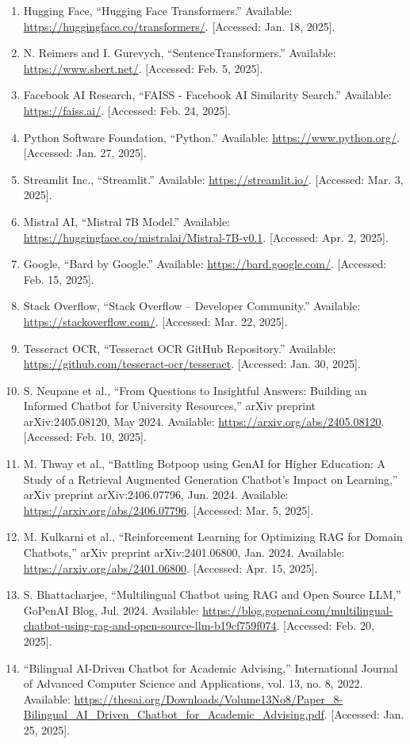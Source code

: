 \documentclass[12pt]{report}
\begin{document}
\vspace{1cm} 

\begin{enumerate}
    \item Hugging Face, “Hugging Face Transformers.” Available: \url{https://huggingface.co/transformers/}. [Accessed: Jan. 18, 2025].
    \item N. Reimers and I. Gurevych, “SentenceTransformers.” Available: \url{https://www.sbert.net/}. [Accessed: Feb. 5, 2025].
    \item Facebook AI Research, “FAISS - Facebook AI Similarity Search.” Available: \url{https://faiss.ai/}. [Accessed: Feb. 24, 2025].
    \item Python Software Foundation, “Python.” Available: \url{https://www.python.org/}. [Accessed: Jan. 27, 2025].
    \item Streamlit Inc., “Streamlit.” Available: \url{https://streamlit.io/}. [Accessed: Mar. 3, 2025].
    \item Mistral AI, “Mistral 7B Model.” Available: \url{https://huggingface.co/mistralai/Mistral-7B-v0.1}. [Accessed: Apr. 2, 2025].
    \item Google, “Bard by Google.” Available: \url{https://bard.google.com/}. [Accessed: Feb. 15, 2025].
    \item Stack Overflow, “Stack Overflow – Developer Community.” Available: \url{https://stackoverflow.com/}. [Accessed: Mar. 22, 2025].
    \item Tesseract OCR, “Tesseract OCR GitHub Repository.” Available: \url{https://github.com/tesseract-ocr/tesseract}. [Accessed: Jan. 30, 2025].
    \item S. Neupane et al., “From Questions to Insightful Answers: Building an Informed Chatbot for University Resources,” arXiv preprint arXiv:2405.08120, May 2024. Available: \url{https://arxiv.org/abs/2405.08120}. [Accessed: Feb. 10, 2025].
    \item M. Thway et al., “Battling Botpoop using GenAI for Higher Education: A Study of a Retrieval Augmented Generation Chatbot's Impact on Learning,” arXiv preprint arXiv:2406.07796, Jun. 2024. Available: \url{https://arxiv.org/abs/2406.07796}. [Accessed: Mar. 5, 2025].
    \item M. Kulkarni et al., “Reinforcement Learning for Optimizing RAG for Domain Chatbots,” arXiv preprint arXiv:2401.06800, Jan. 2024. Available: \url{https://arxiv.org/abs/2401.06800}. [Accessed: Apr. 15, 2025].
    \item S. Bhattacharjee, “Multilingual Chatbot using RAG and Open Source LLM,” GoPenAI Blog, Jul. 2024. Available: \url{https://blog.gopenai.com/multilingual-chatbot-using-rag-and-open-source-llm-b19cf759f074}. [Accessed: Feb. 20, 2025].
    \item “Bilingual AI-Driven Chatbot for Academic Advising,” International Journal of Advanced Computer Science and Applications, vol. 13, no. 8, 2022. Available: \url{https://thesai.org/Downloads/Volume13No8/Paper_8-Bilingual_AI_Driven_Chatbot_for_Academic_Advising.pdf}. [Accessed: Jan. 25, 2025].
\end{enumerate}
\end{document}
